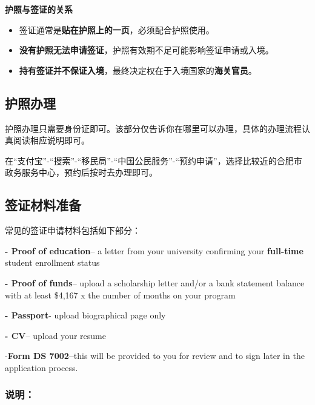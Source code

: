 \textbf{护照与签证的关系}
\begin{itemize}
    \item 签证通常是\textbf{贴在护照上的一页}，必须配合护照使用。
    \item \textbf{没有护照无法申请签证}，护照有效期不足可能影响签证申请或入境。
    \item \textbf{持有签证并不保证入境}，最终决定权在于入境国家的\textbf{海关官员}。
\end{itemize}


\subsection*{护照办理}

护照办理只需要身份证即可。该部分仅告诉你在哪里可以办理，具体的办理流程认真阅读相应说明即可。

在“支付宝”-“搜索”-“移民局”-“中国公民服务”-“预约申请”，选择比较近的合肥市政务服务中心，预约后按时去办理即可。


\subsection*{签证材料准备}

常见的签证申请材料包括如下部分：

\textbf{- Proof of education}– a letter from your university confirming your \textbf{full-time} student enrollment status

\textbf{- Proof of funds}– upload a scholarship letter and/or a bank statement balance with at least \$4,167 x the number of months on your program

\textbf{- Passport}- upload biographical page only 

 \textbf{- CV}– upload your resume 
 
-\textbf{Form DS 7002–}this will be provided to you for review and to sign later in the application process.  

\subsubsection*{说明：}

